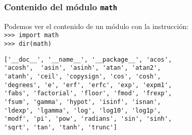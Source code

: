 \begin{frame}[fragile]
\frametitle{Contenido del módulo \texttt{math}}
Podemos ver el contenido de un módulo con la instrucción:
\\
\verb|>>> import math| \\
\verb|>>> dir(math)|
\begin{verbatim}
['__doc__', '__name__', '__package__', 'acos',
'acosh',  'asin', 'asinh', 'atan', 'atan2',
'atanh', 'ceil', 'copysign', 'cos', 'cosh',
'degrees', 'e', 'erf', 'erfc', 'exp', 'expm1',
'fabs', 'factorial', 'floor', 'fmod', 'frexp',
'fsum', 'gamma', 'hypot', 'isinf', 'isnan',
'ldexp', 'lgamma', 'log', 'log10', 'log1p',
'modf', 'pi', 'pow', 'radians', 'sin', 'sinh',
'sqrt', 'tan', 'tanh', 'trunc']
\end{verbatim}
\end{frame}
